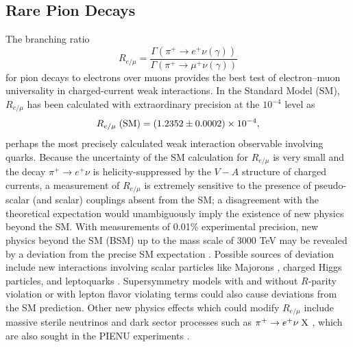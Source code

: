 \subsection{Rare Pion Decays}

The branching ratio 
\begin{equation}
R_{e/\mu} = \frac{\Gamma\left(\pi^+ \rightarrow e^+ \nu (\gamma) \right)}{\Gamma\left(\pi^+ \rightarrow \mu^+ \nu (\gamma)\right)}
\end{equation}
for pion decays to electrons over muons provides the best test of electron--muon universality in charged-current weak interactions. In the Standard Model (SM), $R_{e/\mu}$ has been calculated with extraordinary precision at the $10^{-4}$ level as \cite{Cirigliano1,Cirigliano2,Bryman1}
\begin{equation}
\label{Remu_SM}
    R_{e/\mu} \hspace{0.1cm}\text{(SM)} = (1.2352\pm 0.0002)\times10^{-4},
\end{equation}
perhaps the most precisely calculated weak interaction observable involving quarks. Because the
uncertainty of the SM calculation for $R_{e/\mu}$ is very small and the decay $\pi^+ \rightarrow e^+ \nu$ is helicity-suppressed by the $V-A$ structure of charged currents, a measurement of $R_{e/\mu}$ is extremely sensitive to the presence of pseudo-scalar (and scalar) couplings absent from the SM; a disagreement with the theoretical expectation would unambiguously imply the existence of new physics beyond the SM. With measurements of 0.01\% experimental precision, new physics beyond the SM (BSM) up to the mass scale of 3000 TeV may be revealed by a deviation from the precise SM expectation \cite{Bryman1}. Possible sources of deviation include new interactions involving scalar particles like Majorons \cite{Lessa}, charged Higgs particles, and leptoquarks \cite{Campbell}. Supersymmetry models with and without $R$-parity violation \cite{Ramsey-Musolf} or with lepton flavor violating terms \cite{Masiero} could also cause deviations from the SM prediction. Other new physics effects which could modify $R_{e/\mu}$ include massive sterile neutrinos \cite{Bryman2} and dark sector processes such as $\pi^+ \rightarrow e^+ \nu \hspace{1mm}\textrm{X}$ \cite{Altmannshofer}, which are also sought in the PIENU experiments \cite{Aguilar-Arevalo1, Aguilar-Arevalo2}. 

